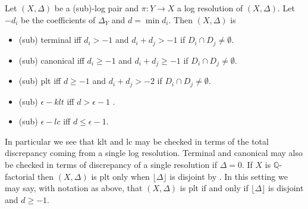 



\begin{corollary}
	Let $(X,\Delta)$ be a (sub)-log pair and $\pi:Y\to X$ a log resolution of $(X,\Delta)$. Let $-d_{i}$ be the coefficients of $\Delta_{Y}$ and $d=\min d_{i}.$
	Then $(X,\Delta)$ is
	\begin{itemize}
		\item 	(sub) terminal iff $d_{i} > -1$ and $d_{i}+d_{j} > -1$ if $D_{i} \cap D_{j} \neq \emptyset$.
		\item	(sub) canonical iff $d_{i} \geq -1$ and $d_{i}+d_{j} \geq - 1$ if $D_{i} \cap D_{j} \neq \emptyset$. 
		\item 	(sub) plt iff $d \geq -1$ and $d_{i}+d_{j} > -2$ if $D_{i} \cap D_{j} \neq \emptyset$.
		\item	(sub) $\epsilon-klt$ iff $d > \epsilon-1$ .
		\item	(sub) $\epsilon-lc$ iff $d \leq \epsilon-1$.
	\end{itemize}
\end{corollary}

In particular we see that klt and lc may be checked in terms of the total discrepancy coming from a single log resolution. Terminal and canonical may also be checked in terms of discrepancy of a single resolution if $\Delta=0$. If $X$ is $\mathbb{Q}$-factorial then $(X,\Delta)$ is plt only when $\lfloor \Delta \rfloor$ is disjoint by \cite[Lemma 2.28]{bhatt2020}. In this setting we may say, with notation as above, that $(X,\Delta)$ is plt if and only if $\lfloor \Delta \rfloor$ is disjoint and $d \geq -1$.


